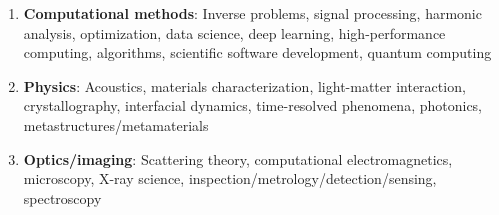 \begin{enumerate}
    \item \textbf{Computational methods}: Inverse problems, signal processing, harmonic analysis, optimization, data science, deep learning, high-performance computing, algorithms, scientific software development, quantum computing
    \item \textbf{Physics}: Acoustics, materials characterization, light-matter interaction, crystallography, interfacial dynamics, time-resolved phenomena, photonics, metastructures/metamaterials
    \item \textbf{Optics/imaging}: Scattering theory, computational electromagnetics, microscopy, X-ray science, inspection/metrology/detection/sensing, spectroscopy 
\end{enumerate}